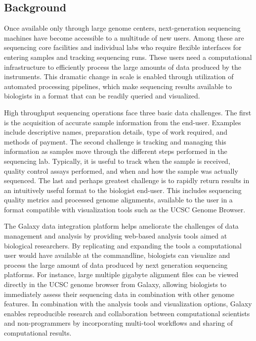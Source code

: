 \documentclass[10pt]{bmc_article}
\newenvironment{bmcformat}{\begin{raggedright}\baselineskip20pt\sloppy\setboolean{publ}{false}}{\end{raggedright}\baselineskip20pt\sloppy}
\begin{document}
\begin{bmcformat}

\section*{Background}

Once available only through large genome centers, next-generation
sequencing machines have become accessible to a multitude of new
users. Among these are sequencing core facilities and individual labs
who require flexible interfaces for entering samples and tracking
sequencing runs. These users need a computational infrastructure to
efficiently process the large amounts of data produced by the
instruments. This dramatic change in scale is enabled through
utilization of automated processing pipelines, which make sequencing
results available to biologists in a format that can be readily
queried and visualized.

High throughput sequencing operations face three basic data
challenges. The first is the acquisition of accurate sample
information from the end-user. Examples include descriptive names,
preparation details, type of work required, and methods of
payment. The second challenge is tracking and managing this
information as samples move through the different steps performed in
the sequencing lab. Typically, it is useful to track when the sample
is received, quality control assays performed, and when and how the
sample was actually sequenced. The last and perhaps greatest challenge
is to rapidly return results in an intuitively useful format to the
biologist end-user.  This includes sequencing quality metrics and
processed genome alignments, available to the user in a format
compatible with visualization tools such as the UCSC Genome Browser.

The Galaxy data integration platform \cite{goecks_galaxy:_2010} helps
ameliorate the challenges of data management and analysis by providing web-based
analysis tools aimed at biological researchers. By replicating and
expanding the tools a computational user would have available at the
commandline, biologists can visualize and process the large amount of
data produced by next generation sequencing platforms. For instance,
large multiple gigabyte alignment files can be viewed directly in the
UCSC genome browser \cite{fujita_ucsc_2011} from Galaxy, allowing
biologists to immediately assess their sequencing data in combination
with other genome features. In combination with the analysis tools and
visualization options, Galaxy enables reproducible research and
collaboration between computational scientists and non-programmers by
incorporating multi-tool workflows and sharing of computational results.


\end{bmcformat}
\end{document}

